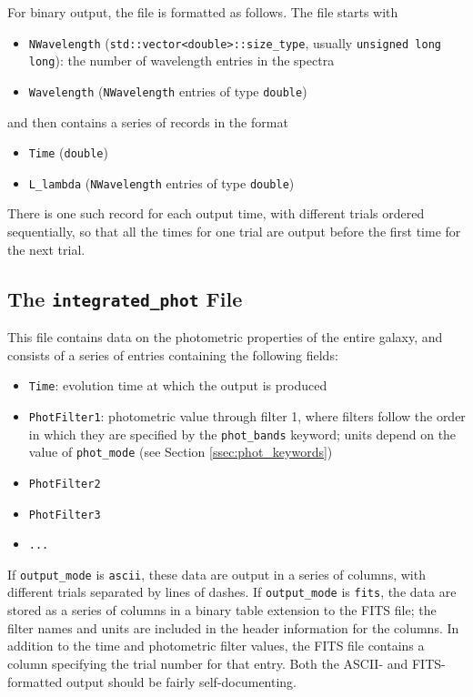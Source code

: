 \documentclass[12pt]{article}
\begin{document}
For binary output, the file is formatted as follows. The file starts with
\begin{itemize}
\item \verb=NWavelength= (\verb=std::vector<double>::size_type=, usually \verb=unsigned long long=): the number of wavelength entries in the spectra
\item \verb=Wavelength= (\verb=NWavelength= entries of type \verb=double=)
\end{itemize}
and then contains a series of records in the format
\begin{itemize}
\item \verb=Time= (\verb=double=)
\item \verb=L_lambda= (\verb=NWavelength= entries of type \verb=double=)
\end{itemize}
There is one such record for each output time, with different trials ordered sequentially, so that all the times for one trial are output before the first time for the next trial.

\subsection{The \texttt{integrated\_phot} File}

This file contains data on the photometric properties of the entire galaxy, and consists of a series of entries containing the following fields:
\begin{itemize}
\item \verb=Time=: evolution time at which the output is produced
\item \verb=PhotFilter1=: photometric value through filter 1, where filters follow the order in which they are specified by the \verb=phot_bands= keyword; units depend on the value of \verb=phot_mode= (see Section \ref{ssec:phot_keywords})
\item \verb=PhotFilter2=
\item \verb=PhotFilter3=
\item \verb=...=
\end{itemize}

If \verb=output_mode= is \verb=ascii=, these data are output in a series of columns, with different trials separated by lines of dashes. If \verb=output_mode= is \verb=fits=, the data are stored as a series of columns in a binary table extension to the FITS file; the filter names and units are included in the header information for the columns. In addition to the time and photometric filter values, the FITS file contains a column specifying the trial number for that entry. Both the ASCII- and FITS-formatted output should be fairly self-documenting.
 
\end{document}
